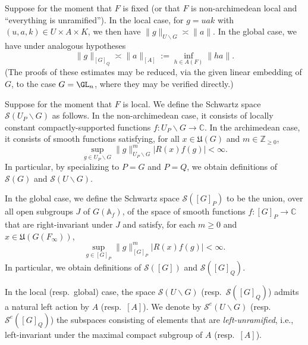 Suppose for the moment that $F$ is fixed (or that $F$ is non-archimedean local and ``everything is unramified'').  In the local case, for $g = u a k$ with $(u,a,k) \in U \times A \times K$, we then have $\|g\|_{U \backslash G} \asymp \|a\|$.  In the global case, we have under analogous hypotheses
\begin{equation*}
  \|g\| _{[G]_Q} \asymp \|a\|_{[A]} := \inf_{h \in A(F)} \|h a\|.
\end{equation*}
(The proofs of these estimates may be reduced, via the given linear embedding of $G$, to the case $G = \GL_n$, where they may be verified directly.)

Suppose for the moment that $F$ is local.  We define the Schwartz space $\mathcal{S}(U_P \backslash G)$ as follows.  In the non-archimedean case, it consists of locally constant compactly-supported functions $f : U_P \backslash G \rightarrow \mathbb{C}$.  In the archimedean case, it consists of smooth functions satisfying, for all $x \in \mathfrak{U}(G)$ and $m \in \mathbb{Z}_{\geq 0}$,
\begin{equation*}
  \sup_{g \in U_P \backslash G} \|g\|_{U_P \backslash G}^m | R(x) f(g) | < \infty.
\end{equation*}
In particular, by specializing to $P = G$ and $P = Q$, we obtain definitions of $\mathcal{S}(G)$ and $\mathcal{S}(U \backslash G)$. 

In the global case, we define the Schwartz space $\mathcal{S}([G]_P)$ to be the union, over all open subgroups $J$ of $G(\mathbb{A}_f)$, of the space of smooth functions $f : [G]_P \rightarrow \mathbb{C}$ that are right-invariant under $J$ and satisfy, for each $m \geq 0$ and $x \in \mathfrak{U}(G(F_\infty))$,
\begin{equation*}
  \sup_{g \in [G]_P} \|g\|_{[G]_P}^m |R(x) f(g)| < \infty.
\end{equation*}
In particular, we obtain definitions of $\mathcal{S}([G])$ and $\mathcal{S}([G]_Q)$.  


In the local (resp.\ global) case, the space $\mathcal{S}(U \backslash G)$ (resp.\ $\mathcal{S}([G]_Q)$) admits a natural left action by $A$ (resp.\ $[A]$).  We denote by $\mathcal{S}^e(U \backslash G)$ (resp.\ $\mathcal{S}^e([G]_Q)$) the subspaces consisting of elements that are \emph{left-unramified}, i.e., left-invariant under the maximal compact subgroup of $A$ (resp.\ $[A]$).  

